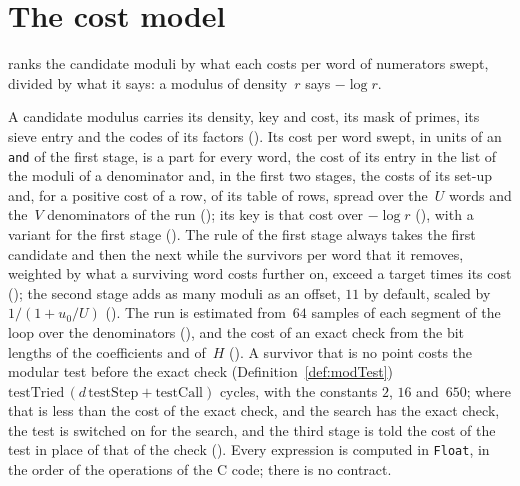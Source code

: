 \section{The cost model}\label{sec:moduliCosts}

\ratpoints{} ranks the candidate moduli by what each costs per word of numerators swept, divided by
what it says: a modulus of density~$r$ says $-\log r$.

\begin{definition}\label{def:costModel}
  \leanok
  A candidate modulus carries its density, key and cost, its mask of primes, its sieve entry and the
  codes of its factors (). Its cost per word swept, in units of an
  \verb|and| of the first stage, is a part for every word, the cost of its entry in the list of the
  moduli of a denominator and, in the first two stages, the costs of its set-up and, for a positive
  cost of a row, of its table of rows, spread over the~$U$ words and the~$V$ denominators of the run
  (); its key is that cost over $-\log r$
  (), with a variant for the first stage
  (). The rule of the first stage always takes the first
  candidate and then the next while the survivors per word that it removes, weighted by what a
  surviving word costs further on, exceed a target times its cost
  (); the second stage adds as many moduli as an offset, $11$ by
  default, scaled by $1/(1 + u_0/U)$ (). The run is estimated
  from~$64$ samples of each segment of the loop over the denominators
  (), and the cost of an exact check from the bit lengths of the
  coefficients and of~$H$ (). A survivor that is no point costs
  the modular test before the exact check (Definition~\ref{def:modTest})
  $\mathrm{testTried}\,(d\,\mathrm{testStep} + \mathrm{testCall})$ cycles, with the constants $2$,
  $16$ and~$650$; where that is less than the cost of the exact check, and the search has the exact
  check, the test is switched on for the search, and the third stage is told the cost of the test in
  place of that of the check (). Every expression is computed in
  \verb|Float|, in the order of the operations of the C code; there is no contract.
\end{definition}

